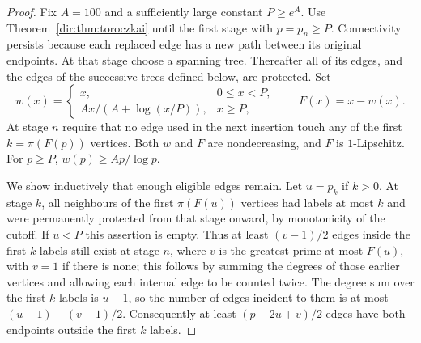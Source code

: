 \begin{proof}
Fix $A=100$ and a sufficiently large constant $P\ge e^A$. Use
Theorem~\ref{dir:thm:toroczkai} until the first stage with $p=p_n\ge P$. Connectivity persists
because each replaced edge has a new path between its original endpoints. At that
stage choose a spanning tree. Thereafter all of its edges, and the edges of the
successive trees defined below, are protected. Set
\[
 w(x)=\begin{cases}
 x,&0\le x<P,\\
 Ax/(A+\log(x/P)),&x\ge P,
 \end{cases}
 \qquad F(x)=x-w(x).
\]
At stage $n$ require that no edge used in the next insertion touch any of the first
$k=\pi(F(p))$ vertices. Both $w$ and $F$ are nondecreasing, and $F$ is $1$-Lipschitz.
For $p\ge P$, $w(p)\ge Ap/\log p$.

We show inductively that enough eligible edges remain. Let $u=p_k$ if $k>0$. At stage
$k$, all neighbours of the first $\pi(F(u))$ vertices had labels at most $k$ and were
permanently protected from that stage onward, by monotonicity of the cutoff. If $u<P$
this assertion is empty. Thus at least $(v-1)/2$ edges inside the first $k$ labels
still exist at stage $n$, where $v$ is the greatest prime at most $F(u)$, with $v=1$ if
there is none; this follows by summing the degrees of those earlier vertices and
allowing each internal edge to be counted twice. The degree sum over the first $k$
labels is $u-1$, so the number of edges incident to them is at most
$(u-1)-(v-1)/2$. Consequently at least $(p-2u+v)/2$ edges have both endpoints outside
the first $k$ labels.


\end{proof}

